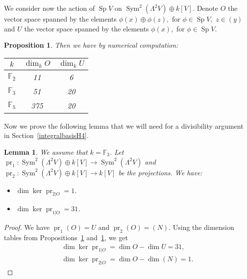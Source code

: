 \documentclass{alggeom}
\DeclareMathOperator{\Sym}{Sym}
\DeclareMathOperator{\Sp}{Sp}
\DeclareMathOperator{\pr}{pr}
\theoremstyle{plain}
\newtheorem{lemme}[theorem]{Lemma}
\newtheorem{proposition}[theorem]{Proposition}
\theoremstyle{definition}
\theoremstyle{remark}
\begin{document}
We consider now the action of $\Sp V$ on $\Sym^2 (\Lambda^2V)\oplus k[V]$. 
Denote $O$ the vector space spanned by the elements $\phi(x)\oplus \phi(z),$ for $\phi \in \Sp V,$ $z \in (y)$
and $U$ the vector space spanned by the elements $\phi(x),$ for $\phi \in \Sp V$.
\begin{proposition}\label{CombinedSymplectic}
Then we have by numerical computation:
\vspace{2mm}
\begin{center}
\begin{tabular}{c||c|c}
 $k$ & $\dim_k O$  & $\dim_k U$\\
\hline
$\mathbb F_2$ & 11 & 6 \\
$\mathbb F_3$ & 51  & 20 \\
$\mathbb F_5$ & 375  & 20 
\end{tabular}
\end{center}
\end{proposition}
Now we prove the following lemma that we will need for a divisibility argument in Section~\ref{integralbasisH4}.
\begin{lemme}\label{cleffinclassesdiv}
We assume that $k=\mathbb F_3$. Let $\pr_1: \Sym^2 (\Lambda^2V)\oplus k[V]\rightarrow \Sym^2 (\Lambda^2V)$ and $\pr_2: \Sym^2 (\Lambda^2V)\oplus k[V]\rightarrow k[V]$ be the projections. 
We have: 
\begin{itemize}
\item[(i)]
$\dim \ker\pr_{2|O}=1$.
\item[(ii)]
$\dim \ker\pr_{1|O}=31$.
\end{itemize}
\end{lemme}
\begin{proof}
We have $\pr_{1}(O)=U$ and $\pr_{2}(O)=(N)$. Using the dimension tables from Propositions~\ref{CombinedSymplectic} and~\ref{cleffinclassesdiv}, we get
\begin{gather*}
\dim \ker\pr_{1|O} = \dim O - \dim U  = 31,\\
\dim \ker\pr_{2|O} = \dim O - \dim (N) = 1.
\end{gather*}

\end{proof}
\end{document}
